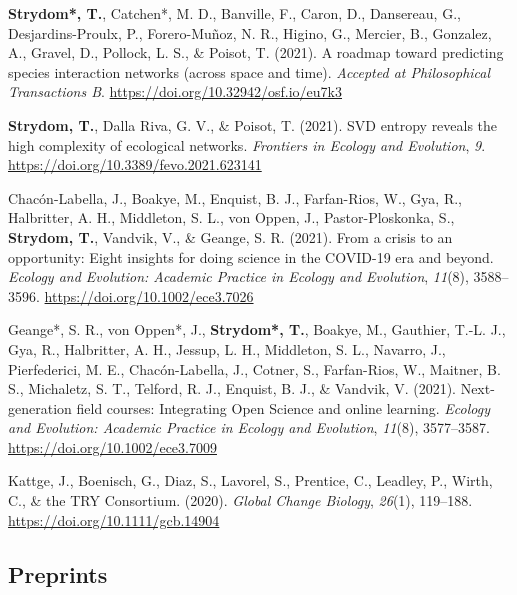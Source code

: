 \documentclass[11pt, a4paper]{awesome-cv}
\begin{document}
\begingroup
\setlength{\parindent}{-0.5in}
\setlength{\leftskip}{0.5in}

\hypertarget{refs_journals}{}
\leavevmode\hypertarget{ref-StrydomPriPre2021}{}%
\textbf{Strydom*, T.}, Catchen*, M. D., Banville, F., Caron, D., Dansereau, G., Desjardins-Proulx, P., Forero-Muñoz, N. R., Higino, G., Mercier, B., Gonzalez, A., Gravel, D., Pollock, L. S., \& Poisot, T. (2021). A roadmap toward predicting species interaction networks (across space and time). \emph{Accepted at Philosophical Transactions B}. \url{https://doi.org/10.32942/osf.io/eu7k3}

\leavevmode\hypertarget{ref-StrydomSVDEnt2020}{}%
\textbf{Strydom, T.}, Dalla Riva, G. V., \& Poisot, T. (2021). SVD entropy reveals the high complexity of ecological networks. \emph{Frontiers in Ecology and Evolution}, \emph{9}. \url{https://doi.org/10.3389/fevo.2021.623141}

\leavevmode\hypertarget{ref-Chac_2020}{}%
Chacón-Labella, J., Boakye, M., Enquist, B. J., Farfan-Rios, W., Gya, R., Halbritter, A. H., Middleton, S. L., von Oppen, J., Pastor-Ploskonka, S., \textbf{Strydom, T.}, Vandvik, V., \& Geange, S. R. (2021). From a crisis to an opportunity: {Eight} insights for doing science in the {COVID}-19 era and beyond. \emph{Ecology and Evolution: Academic Practice in Ecology and Evolution}, \emph{11}(8), 3588--3596. \url{https://doi.org/10.1002/ece3.7026}

\leavevmode\hypertarget{ref-Geange_2020}{}%
Geange*, S. R., von Oppen*, J., \textbf{Strydom*, T.}, Boakye, M., Gauthier, T.-L. J., Gya, R., Halbritter, A. H., Jessup, L. H., Middleton, S. L., Navarro, J., Pierfederici, M. E., Chacón-Labella, J., Cotner, S., Farfan-Rios, W., Maitner, B. S., Michaletz, S. T., Telford, R. J., Enquist, B. J., \& Vandvik, V. (2021). Next-generation field courses: {Integrating Open Science} and online learning. \emph{Ecology and Evolution: Academic Practice in Ecology and Evolution}, \emph{11}(8), 3577--3587. \url{https://doi.org/10.1002/ece3.7009}

\leavevmode\hypertarget{ref-Kattge_2020}{}%
Kattge, J., Boenisch, G., Diaz, S., Lavorel, S., Prentice, C., Leadley, P., Wirth, C., \& the TRY Consortium. (2020). \emph{Global Change Biology}, \emph{26}(1), 119--188. \url{https://doi.org/10.1111/gcb.14904}

\endgroup
\vspace{\baselineskip}

\hypertarget{preprints}{%
\subsection{\texorpdfstring{\textbf{Preprints}}{Preprints}}\label{preprints}}
\end{document}
